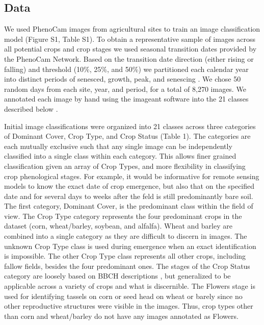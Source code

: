 \documentclass[remotesensing,article,submit,moreauthors,pdftex]{Definitions/mdpi}
\begin{document}
\subsection{Data}

We used PhenoCam images from agricultural sites to train an image classification model (Figure S1, Table S1). To obtain a representative sample of images across all potential crops and crop stages we used seasonal transition dates provided by the PhenoCam Network. Based on the transition date direction (either rising or falling) and threshold (10\%, 25\%, and 50\%) we partitioned each calendar year into distinct periods of senesced, growth, peak, and senescing \citep{richardson2018a}. We chose 50 random days from each site, year, and period, for a total of 8,270 images. We annotated each image by hand using the imageant software into the 21 classes described below \citep{barve2019}.

Initial image classifications were organized into 21 classes across three categories of Dominant Cover, Crop Type, and Crop Status (Table 1). The categories are each mutually exclusive such that any single image can be independently classified into a single class within each category. This allows finer grained classification given an array of Crop Types, and more flexibility in classifying crop phenological stages. For example, it would be informative for remote sensing models to know the exact date of crop emergence, but also that on the specified date and for several days to weeks after the feld is still predominantly bare soil. The first category, Dominant Cover, is the predominant class within the field of view. The Crop Type category represents the four predominant crops in the dataset (corn, wheat/barley, soybean, and alfalfa). Wheat and barley are combined into a single category as they are difficult to discern in images. The unknown Crop Type class is used during emergence when an exact identification is impossible. The other Crop Type class represents all other crops, including fallow fields, besides the four predominant ones. The stages of the Crop Status category are loosely based on BBCH descriptions \citep{meier1997}, but generalized to be applicable across a variety of crops and what is discernible. The Flowers stage is used for identifying tassels on corn or seed head on wheat or barely since no other reproductive structures were visible in the images. Thus, crop types other than corn and wheat/barley do not have any images annotated as Flowers.
\end{document}
